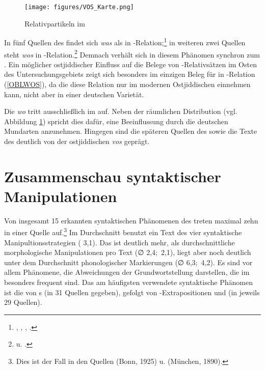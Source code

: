 \begin{figure}
\centering
\texttt{[image: figures/VOS\_Karte.png]}
		\caption{\label{KarteVos}  Relativpartikeln im }
	\end{figure}
 




In fünf Quellen des  findet sich \textit{was} als  in -Relation;\footnote{ , , , .} in weiteren zwei Quellen steht \textit{wos} in -Relation.\footnote{ u. .} Demnach verhält sich  in diesem Phänomen synchron zum . Ein möglicher ostjiddischer Einfluss auf die Belege von -Relativsätzen im Osten des Untersuchungsgebiets zeigt sich besonders im einzigen Beleg für  in -Relation (\ref{OBLWOS}), da die  diese Relation nur im modernen Ostjiddischen einnehmen kann, nicht aber in einer deutschen Varietät. 



Die  \textit{wo} tritt ausschließlich im  auf. Neben der räumlichen Distribution (vgl.\, Abbildung \ref{KarteVos}) spricht dies dafür, eine Beeinflussung durch die deutschen Mundarten anzunehmen. Hingegen sind die späteren Quellen des  sowie die Texte des  deutlich von der ostjiddischen  \textit{vos} geprägt. 


 \section{Zusammenschau syntaktischer Manipulationen}\label{fazitsyn}
 Von insgesamt 15 erkannten syntaktischen Phänomenen des  treten maximal zehn in einer Quelle auf.\footnote{Dies ist der Fall in den Quellen  (Bonn, 1925) u.  (München, 1890).} Im Durchschnitt benutzt ein Text des  vier syntaktische Manipultionsstrategien ({\Stabw} 3,1). 
 Das ist deutlich mehr, als durchschnittliche morphologische Manipulationen pro Text (∅ 2,4;\, {\Stabw} 2,1), liegt aber noch deutlich unter dem Durchschnitt phonologischer Markierungen (∅ 6,3;\, {\Stabw} 4,2). Es sind vor allem Phänomene, die Abweichungen der Grundwortstellung darstellen, die im  besonders frequent sind. 
 Das am häufigsten verwendete syntaktische Phänomen ist die  von \hai{{\NP}}s (in 31 Quellen gegeben), gefolgt von \hai{{\PP}}-Extrapositionen und \hai{{\VR}} (in jeweils 29 Quellen). 
 
